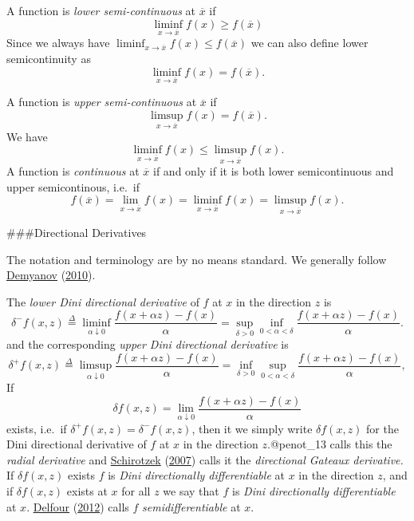 \documentclass[
  12pt,
]{book}
\begin{document}
A function is \emph{lower semi-continuous} at \(\overline{x}\) if
\[
\liminf_{x\rightarrow \overline{x}}f(x)\geq f(\overline{x})
\]
Since we always have \(\liminf_{x\rightarrow \overline{x}}f(x)\leq f(\overline{x})\)
we can also define lower semicontinuity as
\[
\liminf_{x\rightarrow \overline{x}}f(x)=f(\overline{x}).
\]

A function is \emph{upper semi-continuous} at \(\overline{x}\) if
\[
\limsup_{x\rightarrow \overline{x}}f(x)= f(\overline{x}).
\]
We have
\[
\liminf_{x\rightarrow \overline{x}}f(x)\leq\limsup_{x\rightarrow \overline{x}}f(x).
\]
A function is \emph{continuous}
at \(\overline{x}\) if and only if it is both lower semicontinuous and upper semicontinous, i.e.~if
\[
f(\overline{x})=\lim_{x\rightarrow \overline{x}} f(x)=\liminf_{x\rightarrow \overline{x}}f(x)=\limsup_{x\rightarrow \overline{x}} f(x).
\]

\#\#\#Directional Derivatives

The notation and terminology are by no means standard. We generally follow \protect\hyperlink{ref-demyanov_10}{Demyanov} (\protect\hyperlink{ref-demyanov_10}{2010}).

The \emph{lower Dini directional derivative} of \(f\) at \(x\) in the direction \(z\) is
\[
\delta^-f(x,z)\mathop{=}\limits^{\Delta}\liminf_{\alpha\downarrow 0}\frac{f(x+\alpha z)-f(x)}{\alpha}=\sup_{\delta>0}\inf_{0<\alpha<\delta}\frac{f(x+\alpha z)-f(x)}{\alpha}.
\]
and the corresponding \emph{upper Dini directional derivative} is
\[
\delta^+f(x,z)\mathop{=}\limits^{\Delta}\limsup_{\alpha\downarrow 0}\frac{f(x+\alpha z)-f(x)}{\alpha}=\inf_{\delta>0}\sup_{0<\alpha<\delta}\frac{f(x+\alpha z)-f(x)}{\alpha},
\]
If
\[
\delta f(x,z)=\lim_{\alpha\downarrow 0}\frac{f(x+\alpha z)-f(x)}{\alpha}
\]
exists, i.e.~if \(\delta^+f(x,z)=\delta^-f(x,z)\), then it we simply
write \(\delta f(x,z)\) for the Dini directional derivative of \(f\) at \(x\) in the
direction \(z\).@penot\_13 calls this the \emph{radial derivative} and \protect\hyperlink{ref-schirotzek_07}{Schirotzek} (\protect\hyperlink{ref-schirotzek_07}{2007}) calls it the \emph{directional Gateaux derivative.} If \(\delta f(x,z)\) exists \(f\) is \emph{Dini directionally differentiable}
at \(x\) in the direction \(z\), and if \(\delta f(x,z)\) exists at \(x\) for all \(z\) we say that \(f\) is \emph{Dini directionally differentiable} at \(x.\) \protect\hyperlink{ref-delfour_12}{Delfour} (\protect\hyperlink{ref-delfour_12}{2012}) calls \(f\)
\emph{semidifferentiable} at \(x\).
\end{document}
